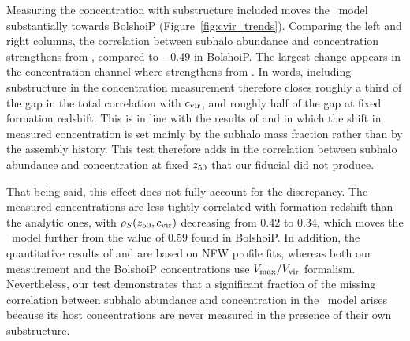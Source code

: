 \documentclass[twocolumn,apj,numberedappendix,twocolappendix,iop]{openjournal}
\begin{document}
Measuring the concentration with substructure included moves the \SatGen\ model substantially towards BolshoiP (Figure~\ref{fig:cvir_trends}). Comparing the left and right columns, the correlation between subhalo abundance and concentration strengthens from  , compared to $-0.49$ in BolshoiP. The largest change appears in the concentration channel where  strengthens from  . In words, including substructure in the concentration measurement therefore closes roughly a third of the gap in the total correlation with $c_{\rm vir}$, and roughly half of the gap at fixed formation redshift. This is in line with the results of \citet{Fielder.etal.20} and \citet{Mezini.etal.23} in which the shift in measured concentration is set mainly by the subhalo mass fraction rather than by the assembly history. This test therefore adds in the correlation between subhalo abundance and concentration at fixed $z_{50}$ that our fiducial did not produce.

That being said, this effect does not fully account for the discrepancy. The measured concentrations are less tightly correlated with formation redshift than the analytic ones, with $\rho_S(z_{50}, c_{\rm vir})$ decreasing from $0.42$ to $0.34$, which moves the \SatGen\ model further from the value of $0.59$ found in BolshoiP. In addition, the quantitative results of \citet{Fielder.etal.20} and \citet{Mezini.etal.23} are based on NFW profile fits, whereas both our measurement and the BolshoiP concentrations use $V_{\rm max}/V_{\rm vir}$ formalism. Nevertheless, our test demonstrates that a significant fraction of the missing correlation between subhalo abundance and concentration in the \SatGen\ model arises because its host concentrations are never measured in the presence of their own substructure.
\end{document}
